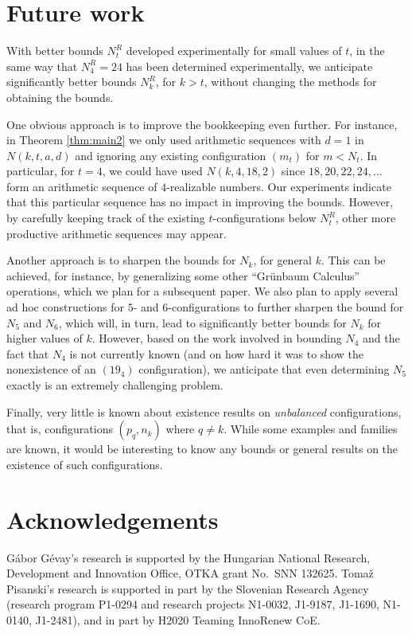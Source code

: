 \documentclass[reqno,12pt]{amsart}
\theoremstyle{plain}
\theoremstyle{definition}
\theoremstyle{remark}
\begin{document}
\section{Future work}


With better bounds  $N^R_{t}$ developed experimentally for small values of $t$, in the same way that $N^R_{4} = 24$ 
has been determined experimentally, we anticipate significantly better bounds $N^{R}_{k}$, for $k > t$, without changing 
the methods for obtaining the bounds. 

One obvious approach is to improve the bookkeeping even further. For instance, in Theorem \ref{thm:main2} we only used 
arithmetic sequences with $d = 1$ in $N(k,t,a,d)$ and ignoring any existing configuration $(m_t)$ for $m < N_t$. In particular, 
for $t = 4$, we could have used $N(k,4,18,2)$ since $18,20,22,24, \ldots $ form an arithmetic sequence of $4$-realizable numbers. 
Our experiments indicate that this particular sequence has no impact in improving the bounds. However, by carefully keeping track 
of the existing $t$-configurations below $N^R_t$, other more productive arithmetic sequences may appear.  

Another approach is to sharpen the bounds for $N_k$, for general $k$. This can be achieved, for instance, by generalizing some other 
``Gr\"unbaum Calculus'' operations, which we plan for a subsequent paper. We also plan to apply several ad hoc constructions for 
$5$- and $6$-configurations to further sharpen the bound for $N_{5}$ and $N_{6}$, which will, in turn,  lead to significantly better 
bounds for $N_{k}$ for higher values of $k$. However, based on the work involved in bounding $N_{4}$ and the fact that $N_{4}$ 
is not currently known (and on how hard it was to show the nonexistence of an $(19_{4})$ configuration), we anticipate that even 
determining $N_{5}$ exactly is an extremely challenging problem.

Finally, very little is known about existence results on \emph{unbalanced} configurations, that is, configurations $(p_{q}, n_{k})$ 
where $q \neq k$. While some examples and families are known, it would be interesting to know any bounds or general results on 
the existence of such configurations.

\section*{Acknowledgements}
G\'abor G\'evay's research is supported by the Hungarian National Research, Development and Innovation Office, OTKA grant No.\ SNN 132625.
Toma\v{z} Pisanski's research is supported in part by the Slovenian Research Agency (research program P1-0294 and research projects 
N1-0032, J1-9187, J1-1690, N1-0140, J1-2481), and in part by H2020 Teaming InnoRenew CoE. 


\end{document}
